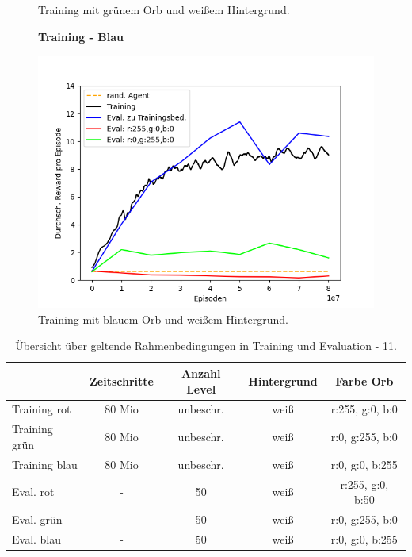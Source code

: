 \begin{figure}[htp!]
\begin{minipage}{0.48\linewidth}
        \caption{Training mit grünem Orb und weißem Hintergrund.}
        \label{fig:grph_green_80Mio_inflvl_15act_Training_evalAsTraining_white}
    \end{minipage}
    \centering
    \begin{minipage}{0.48\linewidth}
\vspace*{0.5cm}
    	\centering
        \textbf{Training - Blau}\par%
        \includegraphics[scale=0.5]{abb/_graphen/floor_80Mio_inflvl_15_act_TrainingBlau_evalRGB_white} 
        \caption{Training mit blauem Orb und weißem Hintergrund.}
        \label{fig:grph_blue_80Mio_inflvl_15act_Training_evalAsTraining_white}
    \end{minipage}
\end{figure}
\begin{center}
 \begin{table}[htp!]
 \begin{center}
  \begin{tabular}{ l c c c c }
    \hline
		               			& Zeitschritte & Anzahl Level & 		Hintergrund & Farbe Orb \\ \hline \hline
     Training rot              			& 80 Mio       & unbeschr.	  & 	    		weiß & r:255, g:0, b:0 \\ \hline
     Training grün              			& 80 Mio       & unbeschr.	  & 	    		weiß & r:0, g:255, b:0 \\ \hline
     Training blau             			& 80 Mio       & unbeschr.	  & 	    		weiß & r:0, g:0, b:255 \\ \hline
     Eval. rot	 	& -	        	   & 50		  	  &			weiß & r:255, g:0, b:50 \\ \hline
     Eval. grün	& -	        	   & 50		  & 	    				weiß & r:0, g:255, b:0  \\ \hline
     Eval. blau 	& -	        	   & 50		  & 	    			weiß & r:0, g:0, b:255  \\ \hline
    \hline
  \end{tabular}
  \caption{Übersicht über geltende Rahmenbedingungen in Training und Evaluation - 11.}
  \label{tab:tab_durch_EXP_trainSetting10}
  \end{center}
 \end{table}
\end{center} 



